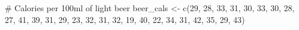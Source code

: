 \documentclass[
  letterpaper,
  DIV=11,
  numbers=noendperiod]{scrreprt}
\newenvironment{Shaded}{\begin{snugshade}}{\end{snugshade}}
\newcommand{\CommentTok}[1]{\textcolor[rgb]{0.37,0.37,0.37}{#1}}
\newcommand{\DecValTok}[1]{\textcolor[rgb]{0.68,0.00,0.00}{#1}}
\newcommand{\FunctionTok}[1]{\textcolor[rgb]{0.28,0.35,0.67}{#1}}
\newcommand{\NormalTok}[1]{\textcolor[rgb]{0.00,0.23,0.31}{#1}}
\newcommand{\OtherTok}[1]{\textcolor[rgb]{0.00,0.23,0.31}{#1}}
\begin{document}
\begin{Shaded}
\begin{Highlighting}[]
\CommentTok{\# Calories per 100ml of light beer}
\NormalTok{beer\_cals }\OtherTok{\textless{}{-}} \FunctionTok{c}\NormalTok{(}\DecValTok{29}\NormalTok{, }\DecValTok{28}\NormalTok{, }\DecValTok{33}\NormalTok{, }\DecValTok{31}\NormalTok{, }\DecValTok{30}\NormalTok{, }\DecValTok{33}\NormalTok{, }\DecValTok{30}\NormalTok{, }\DecValTok{28}\NormalTok{, }\DecValTok{27}\NormalTok{, }\DecValTok{41}\NormalTok{, }\DecValTok{39}\NormalTok{, }\DecValTok{31}\NormalTok{, }\DecValTok{29}\NormalTok{, }
               \DecValTok{23}\NormalTok{, }\DecValTok{32}\NormalTok{, }\DecValTok{31}\NormalTok{, }\DecValTok{32}\NormalTok{, }\DecValTok{19}\NormalTok{, }\DecValTok{40}\NormalTok{, }\DecValTok{22}\NormalTok{, }\DecValTok{34}\NormalTok{, }\DecValTok{31}\NormalTok{, }\DecValTok{42}\NormalTok{, }\DecValTok{35}\NormalTok{, }\DecValTok{29}\NormalTok{, }\DecValTok{43}\NormalTok{)}
\end{Highlighting}
\end{Shaded}
\end{document}
